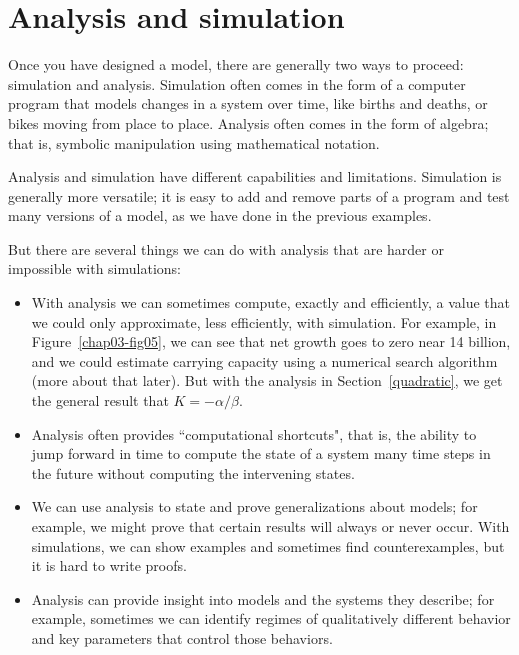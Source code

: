\documentclass[12pt]{book}
\theoremstyle{exercise}
\begin{document}
\section{Analysis and simulation}

Once you have designed a model, there are generally two ways to proceed: simulation and analysis.  Simulation often comes in the form of a computer program that models changes in a system over time, like births and deaths, or bikes moving from place to place.  Analysis often comes in the form of algebra; that is, symbolic manipulation using mathematical notation.

Analysis and simulation have different capabilities and limitations.  Simulation is generally more versatile; it is easy to add and remove parts of a program and test many versions of a model, as we have done in the previous examples.

But there are several things we can do with analysis that are harder or impossible with simulations:

\begin{itemize}

\item With analysis we can sometimes compute, exactly and efficiently, a value that we could only approximate, less efficiently, with simulation.  For example, in Figure~\ref{chap03-fig05}, we can see that net growth goes to zero near 14 billion, and we could estimate carrying capacity using a numerical search algorithm (more about that later).  But with the analysis in Section~\ref{quadratic}, we get the general result that $K=-\alpha/\beta$.

\item Analysis often provides ``computational shortcuts", that is, the ability to jump forward in time to compute the state of a system many time steps in the future without computing the intervening states.

\item We can use analysis to state and prove generalizations about models; for example, we might prove that certain results will always or never occur.  With simulations, we can show examples and sometimes find counterexamples, but it is hard to write proofs.

\item Analysis can provide insight into models and the systems they describe; for example, sometimes we can identify regimes of qualitatively different behavior and key parameters that control those behaviors.

\end{itemize}
\end{document}
